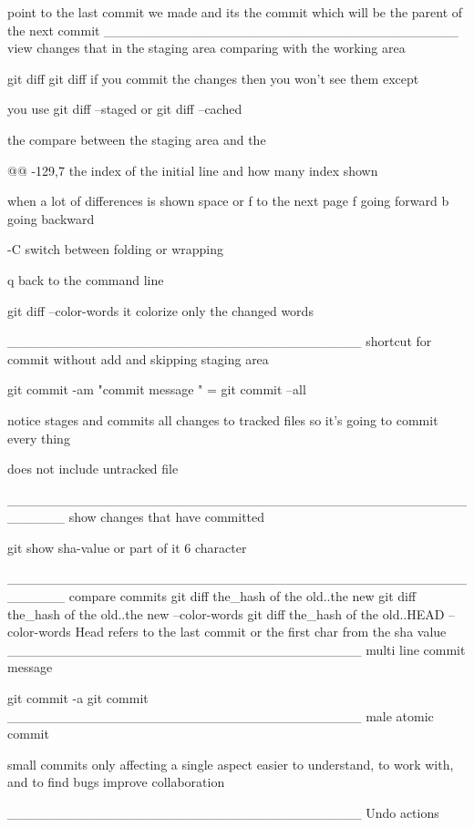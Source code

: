 point to the last commit we made and its the commit which will be the parent of the next commit 
_____________________________________
              view changes that in the staging area comparing with  the working area

git diff 
git diff 
if you commit the changes then you won't see them  except 

you use  
git diff --staged   or  git diff --cached 

the compare between the staging area and the 

@@  -129,7    the index of the initial line and how many index shown 

when a lot of differences is shown 
space or f     to the next page 
f   going forward
b going backward 

-C     switch between folding or wrapping 

q back to the command line 


git diff --color-words
it  colorize only the changed words 

_____________________________________
        shortcut for commit without add and skipping staging area

git commit -am "commit message "  =  git commit --all

notice 
stages and commits all changes to tracked files so it's going to commit every thing 

does not include untracked file 


______________________________________________________
         show changes that have committed 

git show sha-value   or part of it   6 character


______________________________________________________
                          compare commits 
git diff the_hash of the old..the new 
git diff the_hash of the old..the new --color-words 
git diff the_hash of the old..HEAD --color-words 
Head refers to the last commit 
or the first char from the sha value 
_____________________________________
              multi line commit message 
                          
git commit -a 
git commit 
_____________________________________
                male atomic commit 

small commits 
only affecting a single aspect 
easier to understand, to work with, and to find bugs 
improve collaboration 

_____________________________________
Undo actions 

